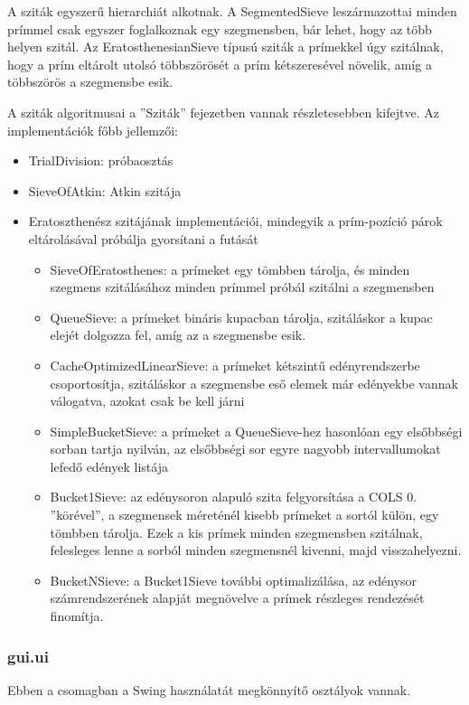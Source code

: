 A sziták egyszerű hierarchiát alkotnak.
A SegmentedSieve leszármazottai minden prímmel csak egyszer foglalkoznak egy szegmensben, bár lehet, hogy az több helyen szitál.
Az EratosthenesianSieve típusú sziták a prímekkel úgy szitálnak, hogy a prím eltárolt utolsó többszörösét a prím kétszeresével növelik, amíg a többszörös a szegmensbe esik.

A sziták algoritmusai a ''Sziták'' fejezetben vannak részletesebben kifejtve.
Az implementációk főbb jellemzői:
\begin{itemize}
\item TrialDivision: próbaosztás
\item SieveOfAtkin: Atkin szitája
\item Eratoszthenész szitájának implementációi, mindegyik a prím-pozíció párok eltárolásával próbálja gyorsítani a futását
\begin{itemize}
\item SieveOfEratosthenes: a prímeket egy tömbben tárolja, és minden szegmens szitálásához minden prímmel próbál szitálni a szegmensben
\item QueueSieve: a prímeket bináris kupacban tárolja, szitáláskor a kupac elejét dolgozza fel, amíg az a szegmensbe esik.
\item CacheOptimizedLinearSieve: a prímeket kétszintű edényrendszerbe csoportosítja, szitáláskor a szegmensbe eső elemek már edényekbe vannak válogatva, azokat csak be kell járni
\item SimpleBucketSieve: a prímeket a QueueSieve-hez hasonlóan egy elsőbbségi sorban tartja nyilván, az elsőbbségi sor egyre nagyobb intervallumokat lefedő edények listája
\item Bucket1Sieve: az edénysoron alapuló szita felgyorsítása a COLS 0. ''körével'', a szegmensek méreténél kisebb prímeket a sortól külön, egy tömbben tárolja. Ezek a kis prímek minden szegmensben szitálnak, felesleges lenne a sorból minden szegmensnél kivenni, majd visszahelyezni.
\item BucketNSieve: a Bucket1Sieve további optimalizálása, az edénysor számrendszerének alapját megnövelve a prímek részleges rendezését finomítja.
\end{itemize}
\end{itemize}

\subsubsection{gui.ui}

Ebben a csomagban a Swing használatát megkönnyítő osztályok vannak.

